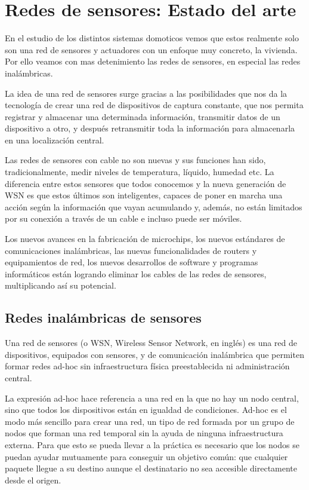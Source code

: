 \chapter{Redes de sensores: Estado del arte}

En el estudio de los distintos sistemas domoticos vemos que estos realmente solo son una red de sensores y actuadores con un enfoque muy concreto, la vivienda. Por ello veamos con mas detenimiento las redes de sensores, en especial las redes inal\'ambricas.

La idea de una red de sensores surge gracias a las posibilidades que nos da la tecnolog\'ia de crear una red de
dispositivos de captura constante, que nos permita registrar y almacenar una determinada informaci\'on, transmitir datos de un dispositivo a otro, y despu\'es retransmitir toda la informaci\'on para almacenarla en una localizaci\'on central.

Las redes de sensores con cable no son nuevas y sus funciones han sido, tradicionalmente, medir niveles de temperatura, l\'iquido, humedad etc. La diferencia entre estos sensores que todos conocemos y la nueva generaci\'on de WSN es que estos \'ultimos son inteligentes, capaces de poner en marcha una acci\'on seg\'un la informaci\'on que vayan acumulando y, adem\'as, no est\'an limitados por su conexi\'on a trav\'es de un cable e incluso puede ser m\'oviles. 

Los nuevos avances en la fabricaci\'on de microchips, los nuevos est\'andares de comunicaciones inal\'ambricas, las nuevas funcionalidades de routers y equipamientos de red, los nuevos desarrollos de software y programas inform\'aticos est\'an logrando eliminar los cables de las redes de sensores, multiplicando as\'i su potencial.

\section{Redes inal\'ambricas de sensores} 

Una red de sensores (o WSN, Wireless Sensor Network, en ingl\'es) es una red de dispositivos, equipados con sensores, y de comunicaci\'on inal\'ambrica que permiten formar redes ad-hoc sin infraestructura f\'isica preestablecida ni administraci\'on central.


La expresi\'on ad-hoc hace referencia a una red en la que no hay un nodo central, sino que todos los dispositivos est\'an en igualdad de condiciones. Ad-hoc es el modo m\'as sencillo para crear una red, un tipo de red formada por un grupo de nodos que forman una red temporal sin la ayuda de ninguna infraestructura externa. Para que esto se pueda llevar a la pr\'actica es necesario que los nodos se puedan ayudar mutuamente para conseguir un objetivo com\'un: que cualquier paquete llegue a su destino aunque el destinatario no sea accesible directamente desde el origen.


